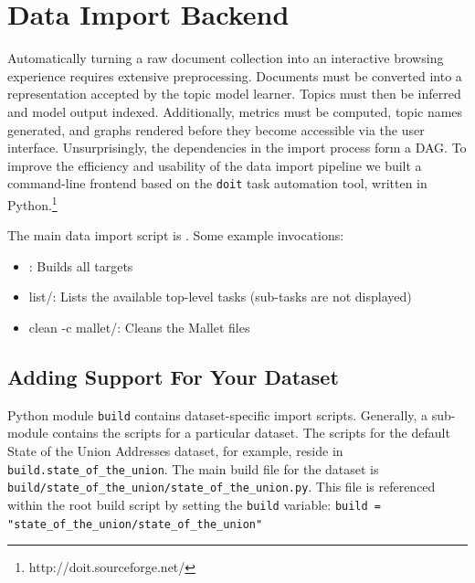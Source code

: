 \documentclass[11pt]{article}
\begin{document}
\section{Data Import Backend}
Automatically turning a raw document collection into an interactive browsing
experience requires extensive preprocessing. Documents must be converted into a
representation accepted by the topic model learner. Topics must then be inferred
and model output indexed. Additionally, metrics must be computed, topic names
generated, and graphs rendered before they become accessible via the user
interface. Unsurprisingly, the dependencies in the import process form a DAG. To
improve the efficiency and usability of the data import pipeline we built a
command-line frontend based on the \verb/doit/ task automation tool, written in
Python.\footnote{http://doit.sourceforge.net/}

The main data import script is \texttt{\buildscript}. Some example invocations:
\begin{itemize}
 \item \texttt{\buildscript}: Builds all targets
 \item \texttt{\buildscript} list/: Lists the available top-level tasks (sub-tasks are not displayed)
 \item \texttt{\buildscript} clean -c mallet/: Cleans the Mallet files
\end{itemize}

%

\subsection{Adding Support For Your Dataset}
Python module \texttt{build} contains dataset-specific import scripts.
Generally, a sub-module contains the scripts for a particular dataset. The
scripts for the default State of the Union Addresses dataset, for example,
reside in \texttt{build.state\_\allowbreak{}of\_\allowbreak{}the\_\allowbreak{}union}. The main build file for the dataset
is \texttt{build/\allowbreak{}state\_\allowbreak{}of\_\allowbreak{}the\_\allowbreak{}union/\allowbreak{}state\_\allowbreak{}of\_\allowbreak{}the\_\allowbreak{}union.py}. This file is
referenced within the root \texttt{\buildscript} build script by setting the
\texttt{build} variable:
\texttt{build = "state\_\allowbreak{}of\_\allowbreak{}the\_\allowbreak{}union/\allowbreak{}state\_\allowbreak{}of\_\allowbreak{}the\_\allowbreak{}union"}
\end{document}
